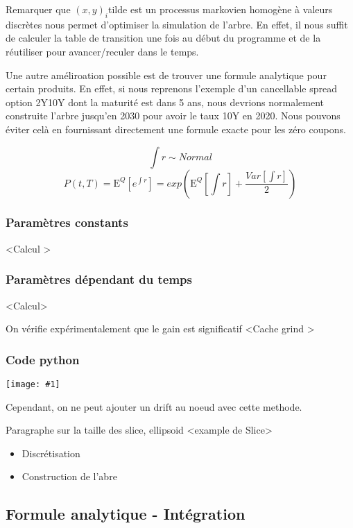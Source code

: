 \documentclass[paper=a4, fontsize=11pt]{scrartcl}
\numberwithin{equation}{section}		%
\numberwithin{figure}{section}			%
\numberwithin{table}{section}				%
\newcommand{\espr}[1]{
  \mathrm{E}^Q \left[ #1 \right]
}
\theoremstyle{definition}
\newcommand{\IMG}[3]{
  \begin{center}
    \texttt{[image: \#1]}%
    \end{center}
}
\begin{document}
Remarquer que $(x, y)_i$tilde est un processus markovien homogène à valeurs discrètes nous permet d'optimiser la simulation de l'arbre. En effet, il nous suffit de calculer la table de transition une fois au début du programme et de la réutiliser pour avancer/reculer dans le temps. 




Une autre améliroation possible est de trouver une formule analytique pour certain produits. En effet, si nous reprenons l'exemple d'un cancellable spread option 2Y10Y dont la maturité est dans 5 ans, nous devrions normalement construite l'arbre jusqu'en 2030 pour avoir le taux 10Y en 2020. Nous pouvons éviter celà en fournissant directement une formule exacte pour les zéro coupons.

$$ \int r \sim Normal$$
$$P(t, T) = \espr{ e^{\int r}} = exp  \left( \espr{ \int r} + \frac{ Var [ \int r ]  }{2} \right) $$

\subsubsection{ Paramètres constants}
<Calcul >
\subsubsection{ Paramètres dépendant du temps}
<Calcul>


On vérifie expérimentalement que le gain est significatif
<Cache grind > 

\subsubsection{Code python}


\IMG{img/slice.png}{Slice}{0.5}

Cependant, on ne peut ajouter un drift au noeud avec cette methode.

Paragraphe sur la taille des slice, ellipsoid
<example de Slice>


\begin{itemize}
\item Discrétisation
\item Construction de l'abre
\end{itemize}

\subsection{Formule analytique - Intégration}
\end{document}
